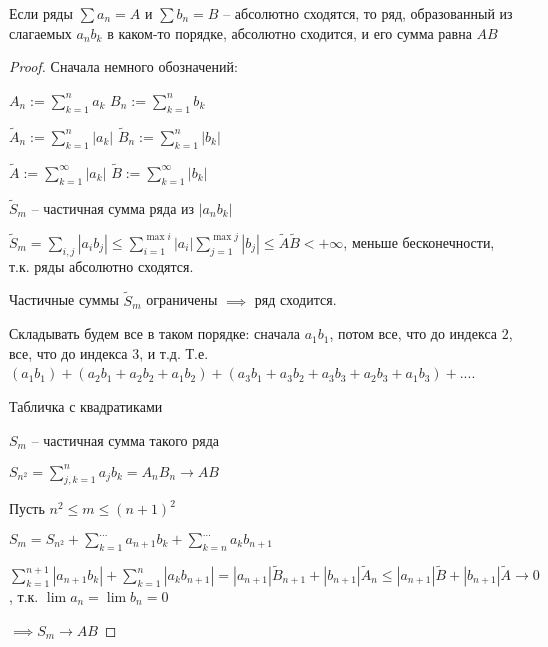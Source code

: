 \begin{theorem}[Коши] \thmslashn
	
	Если ряды $\sum a_n = A$ и $\sum b_n = B$ -- абсолютно сходятся, то ряд, образованный из слагаемых $a_nb_k$ в каком-то порядке, абсолютно сходится, и его сумма равна $AB$
\end{theorem}

\begin{proof} \thmslashn
	
	Сначала немного обозначений:

	$A_n := \sum\limits_{k = 1}^{n} a_k$ $B_n:= \sum\limits_{k=1}^{n}b_k$
	
	$\tilde{A}_n := \sum\limits_{k = 1}^{n}\left|a_k\right|$ $\tilde{B}_n := \sum\limits_{k=1}^{n}\left|b_k\right|$
	
	$\tilde{A} := \sum\limits_{k = 1}^{\infty}\left|a_k\right|$ $\tilde{B} := \sum\limits_{k=1}^{\infty}\left|b_k\right|$
	
	
	$\tilde{S}_m$ -- частичная сумма ряда из $\left|a_nb_k\right|$
	
	$\tilde{S}_m = \sum\limits_{i, j} \left|a_ib_j\right| \le \sum\limits_{i = 1}^{\max{i}}\left|a_i\right|\sum\limits_{j = 1}^{\max{j}}\left|b_j\right| \le \tilde{A}\tilde{B} < +\infty$, меньше бесконечности, т.к. ряды абсолютно сходятся.
	
	Частичные суммы $\tilde{S}_m$ ограничены $\implies $ ряд сходится.
	
	Складывать будем все в таком порядке: сначала $a_1b_1$, потом все, что до индекса $2$, все, что до индекса $3$, и т.д. Т.е. $(a_1b_1) + (a_2b_1 + a_2b_2 + a_1b_2) + (a_3b_1 + a_3b_2 + a_3b_3 + a_2b_3 + a_1b_3) + ...$.
	
	\TODO Табличка с квадратиками 
	
	$S_m$ -- частичная сумма такого ряда
	
	$S_{n^2} = \sum\limits_{j,k=1}^{n} a_j b_k = A_n B_n \to AB$
	
	Пусть $n^2 \le m \le (n+1)^2$
	
	$S_m = S_{n^2} + \sum\limits_{k=1}^{...}a_{n+1}b_k + \sum\limits_{k = n}^{...}a_kb_{n+1}$
	
	$\sum\limits_{k=1}^{n+1}\left|a_{n+1}b_k\right| + \sum\limits_{k=1}^{n}\left|a_kb_{n+1}\right| = \left|a_{n+1}\right|\tilde{B}_{n+1} + \left|b_{n+1}\right|\tilde{A}_{n} \le \left|a_{n+1}\right|\tilde{B} + \left|b_{n+1}\right|\tilde{A} \to 0$, т.к. $\lim a_n = \lim b_n = 0$
	
	$\implies S_m \to AB$
\end{proof}

